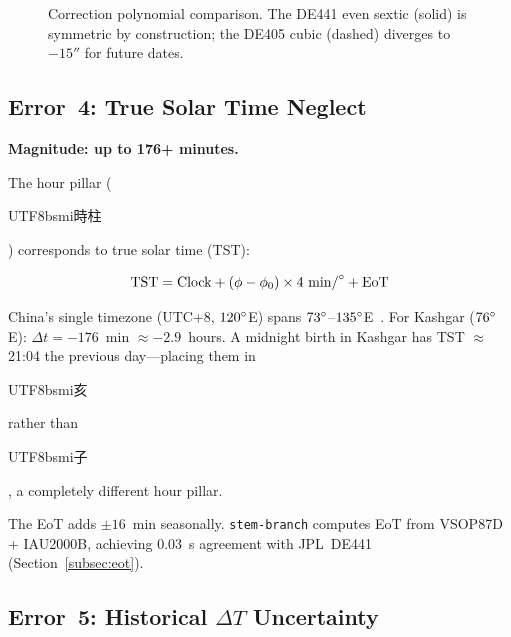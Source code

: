 \documentclass[10pt,a4paper]{article}
\newcommand{\zh}[1]{\begin{CJK}{UTF8}{bsmi}#1\end{CJK}}
\begin{document}
\begin{figure}[H]
\centering
{}
\caption{Correction polynomial comparison. The DE441 even sextic (solid) is
symmetric by construction; the DE405 cubic (dashed) diverges to $-15''$ for
future dates.}
\label{fig:correction}
\end{figure}

\subsection{Error~4: True Solar Time Neglect}
\label{subsec:error4}

\textbf{Magnitude: up to 176+ minutes.}

The hour pillar (\zh{時柱}) corresponds to true solar time (TST):

\begin{equation}
  \text{TST} = \text{Clock} + (\phi - \phi_0) \times 4~\text{min/}\degree
  + \text{EoT}
  \label{eq:tst}
\end{equation}

China's single timezone (UTC+8, $120\degree$E) spans $73\degree$--$135\degree$E~\cite{china_timezone}.
For Kashgar ($76\degree$E): $\Delta t = -176$~min $\approx -2.9$~hours. A
midnight birth in Kashgar has TST $\approx$ 21:04 the previous day---placing
them in \zh{亥} rather than \zh{子}, a completely different hour pillar.

The EoT adds $\pm 16$~min seasonally. \texttt{stem-branch} computes EoT from
VSOP87D + IAU2000B, achieving 0.03~s agreement with JPL~DE441
(Section~\ref{subsec:eot}).

\subsection{Error~5: Historical $\Delta T$ Uncertainty}
\end{document}
